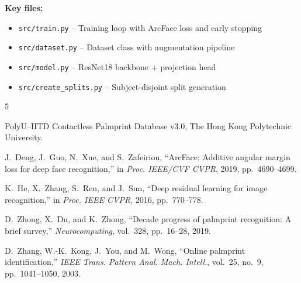 \documentclass[conference]{IEEEtran}
\begin{document}
\noindent\textbf{Key files:}
\begin{itemize}
    \item \texttt{src/train.py} -- Training loop with ArcFace loss and early stopping
    \item \texttt{src/dataset.py} -- Dataset class with augmentation pipeline
    \item \texttt{src/model.py} -- ResNet18 backbone + projection head
    \item \texttt{src/create\_splits.py} -- Subject-disjoint split generation
\end{itemize}


\begin{thebibliography}{5}

PolyU--IITD Contactless Palmprint Database v3.0, The Hong Kong Polytechnic University.

J.~Deng, J.~Guo, N.~Xue, and S.~Zafeiriou, ``ArcFace: Additive angular margin loss for deep face recognition,'' in \textit{Proc. IEEE/CVF CVPR}, 2019, pp.~4690--4699.

K.~He, X.~Zhang, S.~Ren, and J.~Sun, ``Deep residual learning for image recognition,'' in \textit{Proc. IEEE CVPR}, 2016, pp.~770--778.

D.~Zhong, X.~Du, and K.~Zhong, ``Decade progress of palmprint recognition: A brief survey,'' \textit{Neurocomputing}, vol.~328, pp.~16--28, 2019.

D.~Zhang, W.-K.~Kong, J.~You, and M.~Wong, ``Online palmprint identification,'' \textit{IEEE Trans. Pattern Anal. Mach. Intell.}, vol.~25, no.~9, pp.~1041--1050, 2003.

\end{thebibliography}
\end{document}
